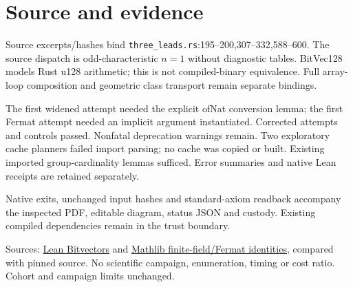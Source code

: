 \documentclass[10pt]{article}
\begin{document}
\section*{Source and evidence}
Source excerpts/hashes bind \texttt{three\_leads.rs}:195--200,307--332,588--600. The source dispatch is odd-characteristic $n=1$ without diagnostic tables. BitVec128 models Rust u128 arithmetic; this is not compiled-binary equivalence. Full array-loop composition and geometric class transport remain separate bindings.

The first widened attempt needed the explicit ofNat conversion lemma; the first Fermat attempt needed an implicit argument instantiated. Corrected attempts and controls passed. Nonfatal deprecation warnings remain. Two exploratory cache planners failed import parsing; no cache was copied or built. Existing imported group-cardinality lemmas sufficed. Error summaries and native Lean receipts are retained separately.

Native exits, unchanged input hashes and standard-axiom readback accompany the inspected PDF, editable diagram, status JSON and custody. Existing compiled dependencies remain in the trust boundary.

Sources: \href{https://lean-lang.org/doc/reference/latest/Basic-Types/Bitvectors/}{Lean Bitvectors} and \href{https://leanprover-community.github.io/mathlib4_docs/Mathlib/FieldTheory/Finite/Basic.html}{Mathlib finite-field/Fermat identities}, compared with pinned source. No scientific campaign, enumeration, timing or cost ratio. Cohort and campaign limits unchanged.
\end{document}
